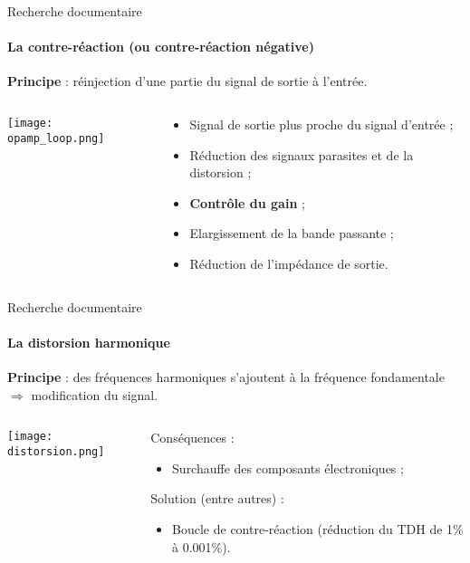 \documentclass[pdf]{beamer}
\begin{document}
\begin{frame}{Recherche documentaire}
	\framesubtitle{La contre-réaction (ou contre-réaction négative)}

	\textbf{Principe} : réinjection d'une partie du signal de sortie à l'entrée.

	\begin{columns}
		\begin{column}{5cm}
			\texttt{[image: opamp\_loop.png]}
		\end{column}

		\begin{column}{5cm}
				\begin{itemize}
					\item Signal de sortie plus proche du signal d'entrée ;
					\item	Réduction des signaux parasites et de la distorsion ;
					\item \textbf{Contrôle du gain} ;
					\item Elargissement de la bande passante ;
					\item Réduction de l'impédance de sortie.
				\end{itemize}
		\end{column}
	\end{columns}
\end{frame}

\begin{frame}{Recherche documentaire}
	\framesubtitle{La distorsion harmonique}

	\textbf{Principe} : des fréquences harmoniques s'ajoutent à la fréquence fondamentale
	$\Rightarrow$ modification du signal.

	\bigbreak

	\begin{columns}
		\begin{column}{5cm}
			\texttt{[image: distorsion.png]}
		\end{column}

		\begin{column}{5cm}
			Conséquences :
			\begin{itemize}
				\item	Surchauffe des composants électroniques ;
			\end{itemize}

			Solution (entre autres) :
			\begin{itemize}
				\item Boucle de contre-réaction (réduction du TDH de 1\% à 0.001\%).
			\end{itemize}
		\end{column}
	\end{columns}
\end{frame}
\end{document}
